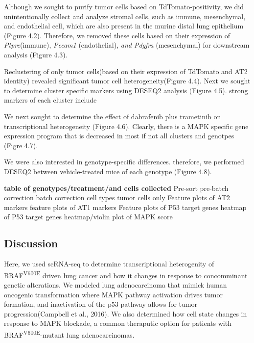 Although we sought to purify tumor cells based on TdTomato-positivity, we did unintentionally collect and analyze stromal cells, such as immune, mesenchymal, and endothelial cell, which are also present in the murine distal lung epithelium (Figure 4.2). Therefore, we removed these cells based on their expression of \emph{Ptprc}(immune), \emph{Pecam1} (endothelial), \emph{and Pdgfra} (mesenchymal) for downstream analysis (Figure 4.3).

Reclustering of only tumor cells(based on their expression of TdTomato and AT2 identity) revealed significant tumor cell heterogeneity(Figure 4.4). Next we sought to determine cluster specific markers using DESEQ2 analysis (Figure 4.5). strong markers of each cluster include

We next sought to determine the effect of dabrafenib plus trametinib on transcriptional heterogeneity (Figure 4.6). Clearly, there is a MAPK specific gene expression program that is decreased in most if not all clusters and genotpes (Figre 4.7).

We were also interested in genotype-specific differences. therefore, we performed DESEQ2 between vehicle-treated mice of each genotype (Figure 4.8).

\textbf{table of genotypes/treatment/and cells collected}
Pre-sort
pre-batch correction
batch correction
cell types
tumor cells only
Feature plots of AT2 markers
feature plots of AT1 markers
Feature plots of P53 target genes
heatmap of P53 target genes
heatmap/violin plot of MAPK score

\hypertarget{discussion-2}{%
\subsection{Discussion}\label{discussion-2}}

Here, we used scRNA-seq to determine transcriptional heterogenity of BRAF\textsuperscript{V600E} driven lung cancer and how it changes in response to concomminant genetic alterations. We modeled lung adenocarcinoma that mimick human oncogenic transformation where MAPK pathway activation drives tumor formation, and inactivation of the p53 pathway allows for tumor progression(Campbell et al., 2016). We also determined how cell state changes in response to MAPK blockade, a common theraputic option for patients with BRAF\textsuperscript{V600E}-mutant lung adenocarcinomas.

